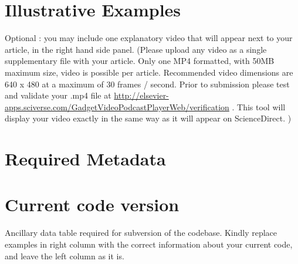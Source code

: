 \documentclass[preprint,12pt, a4paper]{elsarticle}
\begin{document}

\begin{thebibliography}{00}


\bibitem{}

\end{thebibliography}

\section*{Illustrative Examples}
Optional : you may include one explanatory  video that will appear next to your article, in the right hand side panel. (Please upload any video as a single supplementary file with your article. Only one MP4 formatted, with 50MB maximum size, video is possible per article. Recommended video dimensions are 640 x 480 at a maximum of 30 frames / second. Prior to submission please test and validate your .mp4 file at  \url{http://elsevier-apps.sciverse.com/GadgetVideoPodcastPlayerWeb/verification} . This tool will display your video exactly in the same way as it will appear on ScienceDirect. )


\section*{Required Metadata}
\label{}

\section*{Current code version}
\label{}

Ancillary data table required for subversion of the codebase. Kindly replace examples in right column with the correct information about your current code, and leave the left column as it is.
\end{document}
